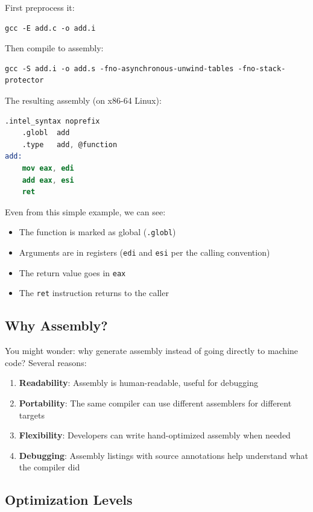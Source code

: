 First preprocess it:
\begin{verbatim}
gcc -E add.c -o add.i
\end{verbatim}

Then compile to assembly:
\begin{verbatim}
gcc -S add.i -o add.s -fno-asynchronous-unwind-tables -fno-stack-protector
\end{verbatim}

The resulting assembly (on x86-64 Linux):

\begin{lstlisting}[language=nasm]
    .intel_syntax noprefix
    .globl  add
    .type   add, @function
add:
    mov eax, edi
    add eax, esi
    ret
\end{lstlisting}

Even from this simple example, we can see:
\begin{itemize}
    \item The function is marked as global (\texttt{.globl})
    \item Arguments are in registers (\texttt{edi} and \texttt{esi} per the calling convention)
    \item The return value goes in \texttt{eax}
    \item The \texttt{ret} instruction returns to the caller
\end{itemize}

\subsection{Why Assembly?}

You might wonder: why generate assembly instead of going directly to machine code? Several reasons:

\begin{enumerate}
    \item \textbf{Readability}: Assembly is human-readable, useful for debugging
    \item \textbf{Portability}: The same compiler can use different assemblers for different targets
    \item \textbf{Flexibility}: Developers can write hand-optimized assembly when needed
    \item \textbf{Debugging}: Assembly listings with source annotations help understand what the compiler did
\end{enumerate}

\subsection{Optimization Levels}


